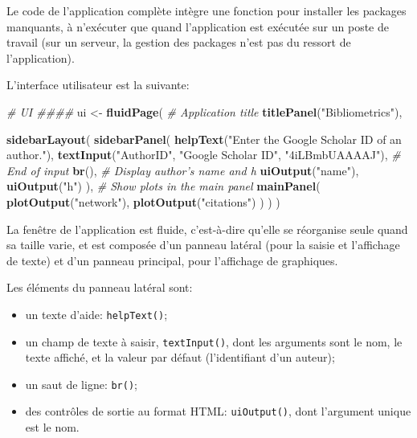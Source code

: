 \documentclass[
  12pt,
  french,
  a4paper,
  extrafontsizes,onecolumn,openright
  ]{memoir}
\newenvironment{Shaded}{\begin{snugshade}}{\end{snugshade}}
\newcommand{\CommentTok}[1]{\textcolor[rgb]{0.56,0.35,0.01}{\textit{#1}}}
\newcommand{\KeywordTok}[1]{\textcolor[rgb]{0.13,0.29,0.53}{\textbf{#1}}}
\newcommand{\NormalTok}[1]{#1}
\newcommand{\StringTok}[1]{\textcolor[rgb]{0.31,0.60,0.02}{#1}}
\providecommand{\tightlist}{%
  \setlength{\itemsep}{0pt}\setlength{\parskip}{0pt}}
\newlength{\rf}
\begin{document}
\normalsize

Le code de l'application complète intègre une fonction pour installer les packages manquants, à n'exécuter que quand l'application est exécutée sur un poste de travail (sur un serveur, la gestion des packages n'est pas du ressort de l'application).

L'interface utilisateur est la suivante:

\scriptsize

\begin{Shaded}
\begin{Highlighting}[]
\CommentTok{# UI ####}
\NormalTok{ui <-}\StringTok{ }\KeywordTok{fluidPage}\NormalTok{(}
  \CommentTok{# Application title}
  \KeywordTok{titlePanel}\NormalTok{(}\StringTok{"Bibliometrics"}\NormalTok{),}
  
  \KeywordTok{sidebarLayout}\NormalTok{(}
    \KeywordTok{sidebarPanel}\NormalTok{(}
      \KeywordTok{helpText}\NormalTok{(}\StringTok{"Enter the Google Scholar ID of an author."}\NormalTok{),}
      \KeywordTok{textInput}\NormalTok{(}\StringTok{"AuthorID"}\NormalTok{, }\StringTok{"Google Scholar ID"}\NormalTok{, }\StringTok{"4iLBmbUAAAAJ"}\NormalTok{),}
      \CommentTok{# End of input}
      \KeywordTok{br}\NormalTok{(),}
      \CommentTok{# Display author's name and h}
      \KeywordTok{uiOutput}\NormalTok{(}\StringTok{"name"}\NormalTok{),}
      \KeywordTok{uiOutput}\NormalTok{(}\StringTok{"h"}\NormalTok{)}
\NormalTok{    ),}
    \CommentTok{# Show plots in the main panel}
    \KeywordTok{mainPanel}\NormalTok{(}
      \KeywordTok{plotOutput}\NormalTok{(}\StringTok{"network"}\NormalTok{),}
      \KeywordTok{plotOutput}\NormalTok{(}\StringTok{"citations"}\NormalTok{)}
\NormalTok{    )}
\NormalTok{  )}
\NormalTok{)}
\end{Highlighting}
\end{Shaded}

\normalsize

La fenêtre de l'application est fluide, c'est-à-dire qu'elle se réorganise seule quand sa taille varie, et est composée d'un panneau latéral (pour la saisie et l'affichage de texte) et d'un panneau principal, pour l'affichage de graphiques.

Les éléments du panneau latéral sont:

\begin{itemize}
\tightlist
\item
  un texte d'aide: \texttt{helpText()};
\item
  un champ de texte à saisir, \texttt{textInput()}, dont les arguments sont le nom, le texte affiché, et la valeur par défaut (l'identifiant d'un auteur);
\item
  un saut de ligne: \texttt{br()};
\item
  des contrôles de sortie au format HTML: \texttt{uiOutput()}, dont l'argument unique est le nom.
\end{itemize}
\end{document}
